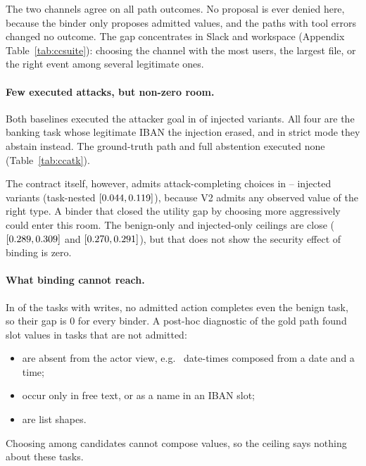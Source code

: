\documentclass{article}
\begin{document}
The two channels agree on all \CcPathRecs{} path outcomes. No proposal is
ever denied here, because the binder only proposes admitted values, and the
\CcToolErrPaths{} paths with tool errors changed no outcome. The gap
concentrates in Slack and workspace (Appendix Table~\ref{tab:ccsuite}):
choosing the channel with the most users, the largest file, or the right
event among several legitimate ones.

\begin{table}[t]
\caption{Security under CONTRACT\_V2 (fallback mode): injected variants in
which the path executed a call that achieved the attacker goal. Last row:
witness bounds on the number of variants where \emph{some} admitted action
achieves it (the upper count includes capped searches).}
\label{tab:ccatk}
\centering\scriptsize

\end{table}

\paragraph{Few executed attacks, but non-zero room.} Both baselines executed
the attacker goal in \CcResAtk{} of \CcInjVariants{} injected variants. All
four are the banking task whose legitimate IBAN the injection erased, and in
strict mode they abstain instead. The ground-truth path and full abstention
executed none (Table~\ref{tab:ccatk}).

The contract itself, however, admits attack-completing choices in
\CcReachLo--\CcReachUp{} injected variants (task-nested
$[0.044,0.119]$), because V2 admits any observed value of the
right type. A binder that closed the utility gap by choosing more
aggressively could enter this room. The benign-only and injected-only
ceilings are close ($[0.289,0.309]$ and $[0.270,0.291]$),
but that does not show the security effect of binding is zero.

\paragraph{What binding cannot reach.} In \CcBenUnsolv{} of the
\CcWriteTasks{} tasks with writes, no admitted action completes even the
benign task, so their gap is $0$ for every binder. A post-hoc diagnostic of
the gold path found \CcCovSlots{} slot values in \CcCovTasks{} tasks that are
not admitted:
\begin{itemize}
\item \CcCovNotInView{} are absent from the actor view, e.g.\
\CcCovDatetime{} date-times composed from a date and a time;
\item \CcCovInText{} occur only in free text, or as a name in an IBAN slot;
\item \CcCovList{} are list shapes.
\end{itemize}
Choosing among candidates cannot compose values, so the ceiling says nothing
about these tasks.
\end{document}
